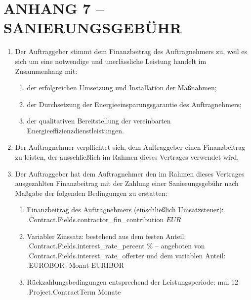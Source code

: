 \section{ANHANG 7 – SANIERUNGSGEBÜHR}


\begin{enumerate}

\item{Der Auftraggeber stimmt dem Finanzbeitrag des Auftragnehmers zu, weil es sich um eine notwendige und unerlässliche Leistung handelt im Zusammenhang mit:}

\begin{enumerate}

	\item der erfolgreichen Umsetzung und Installation der Maßnahmen;
	\item der Durchsetzung der Energieeinsparungsgarantie des Auftragnehmers;
	\item der qualitativen Bereitstellung der vereinbarten Energieeffizienzdienstleistungen.

\end{enumerate}

\item{Der Auftragnehmer verpflichtet sich, dem Auftraggeber einen Finanzbeitrag zu leisten, der ausschließlich im Rahmen dieses Vertrages verwendet wird.}
\item{Der Auftraggeber hat dem Auftragnehmer den im Rahmen dieses Vertrages ausgezahlten Finanzbeitrag mit der Zahlung einer Sanierungsgebühr nach Maßgabe der folgenden Bedingungen zu erstatten:}

\begin{enumerate}
	\item Finanzbeitrag des Auftragnehmers (einschließlich Umsatzsteuer): \iffalse input fields.contractor_fin_contribution value="{{.Contract.Fields.contractor_fin_contribution}}" \fi {{.Contract.Fields.contractor_fin_contribution}} $EUR$
	\item Variabler Zinssatz:
bestehend aus dem festen Anteil:  \iffalse input fields.interest_rate_percent value="{{.Contract.Fields.interest_rate_percent}}" \fi {{.Contract.Fields.interest_rate_percent}} \% – angeboten von \iffalse input fields.interest_rate_offerter value="{{.Contract.Fields.interest_rate_offerter}}" \fi {{.Contract.Fields.interest_rate_offerter}}
und dem variablen Anteil: {{.EUROBOR}} -Monat-EURIBOR
	\item Rückzahlungsbedingungen entsprechend der Leistungsperiode: {{mul 12 .Project.ContractTerm}}  Monate
\end{enumerate}


\end{enumerate}
